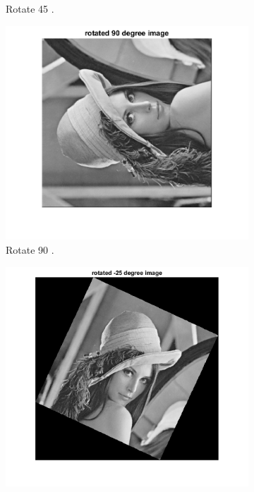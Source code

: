 \documentclass[14pt]{article}
\begin{document}
\begin{figure}[hbt!]
\begin{subfigure}[b]{0.23\linewidth}
			\caption{Rotate 45 \degree.}
		\end{subfigure}
		\begin{subfigure}[b]{0.23\linewidth}
			\includegraphics[width=\linewidth]{rot90.png}
			\caption{Rotate 90 \degree.}
		\end{subfigure}
		\begin{subfigure}[b]{0.23\linewidth}
			\includegraphics[width=\linewidth]{rot-25.png}

\end{subfigure}
\end{figure}
\end{document}
